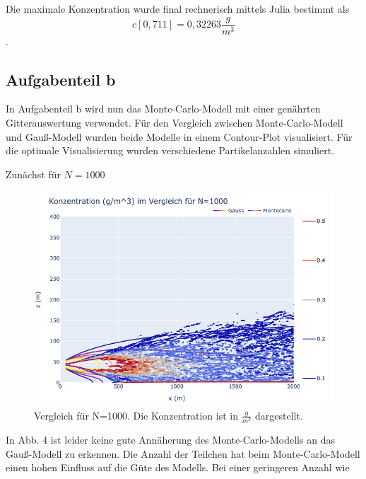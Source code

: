\documentclass[ngerman]{scrartcl}
\begin{document}
Die maximale Konzentration wurde final rechnerisch mittels Julia bestimmt als
\begin{equation}
	c[0,711] = 0,32263  \frac{g}{m^3}
\end{equation}
.

\subsection{Aufgabenteil b}
In Aufgabenteil b wird nun das Monte-Carlo-Modell mit einer genährten Gitterauswertung verwendet.
Für den Vergleich zwischen Monte-Carlo-Modell und Gauß-Modell wurden beide Modelle in einem Contour-Plot visualisiert.  Für die optimale Visualisierung wurden verschiedene Partikelanzahlen simuliert.

Zunächst für $N=1000$
\begin{figure}[H]
	\centering
	\includegraphics[scale=0.5]{Bilder/1b1k.png}
	\caption{Vergleich für N=1000. Die Konzentration ist in $\frac{\si{g}}{\si{m^3}}$ dargestellt.}
	\label{fig:my_label}
\end{figure}
In Abb. 4 ist leider keine gute Annäherung des Monte-Carlo-Modells an das Gauß-Modell zu erkennen. Die Anzahl der Teilchen hat beim Monte-Carlo-Modell einen hohen Einfluss auf die Güte des Modells. Bei einer geringeren Anzahl wie 
\end{document}
